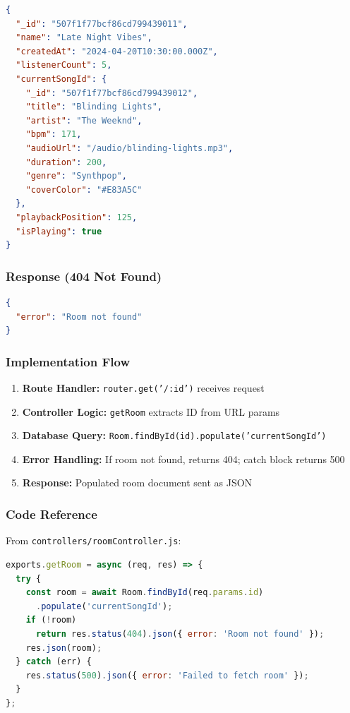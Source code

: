 \documentclass[11pt,a4paper]{article}
\begin{document}
\begin{lstlisting}[language=json]
{
  "_id": "507f1f77bcf86cd799439011",
  "name": "Late Night Vibes",
  "createdAt": "2024-04-20T10:30:00.000Z",
  "listenerCount": 5,
  "currentSongId": {
    "_id": "507f1f77bcf86cd799439012",
    "title": "Blinding Lights",
    "artist": "The Weeknd",
    "bpm": 171,
    "audioUrl": "/audio/blinding-lights.mp3",
    "duration": 200,
    "genre": "Synthpop",
    "coverColor": "#E83A5C"
  },
  "playbackPosition": 125,
  "isPlaying": true
}
\end{lstlisting}

\subsubsection{Response (404 Not Found)}

\begin{lstlisting}[language=json]
{
  "error": "Room not found"
}
\end{lstlisting}

\subsubsection{Implementation Flow}

\begin{enumerate}
    \item \textbf{Route Handler:} \texttt{router.get('/:id')} receives request
    \item \textbf{Controller Logic:} \texttt{getRoom} extracts ID from URL params
    \item \textbf{Database Query:} \texttt{Room.findById(id).populate('currentSongId')}
    \item \textbf{Error Handling:} If room not found, returns 404; catch block returns 500
    \item \textbf{Response:} Populated room document sent as JSON
\end{enumerate}

\subsubsection{Code Reference}

From \texttt{controllers/roomController.js}:
\begin{lstlisting}[language=javascript]
exports.getRoom = async (req, res) => {
  try {
    const room = await Room.findById(req.params.id)
      .populate('currentSongId');
    if (!room) 
      return res.status(404).json({ error: 'Room not found' });
    res.json(room);
  } catch (err) {
    res.status(500).json({ error: 'Failed to fetch room' });
  }
};
\end{lstlisting}
\end{document}
